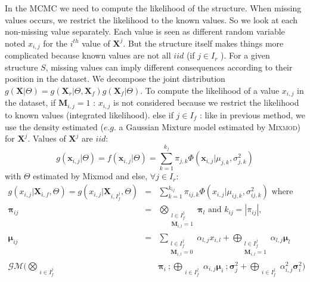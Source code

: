 \documentclass[11pt,a4paper]{report}
\begin{document}
		In the MCMC we need to compute the likelihood of the structure. When missing values occurs, we restrict the likelihood to the known values. So we look at each non-missing value separately. Each value is seen as different random variable noted $x_{i,j}$ for the $i^{th}$ value of $\boldsymbol{X}^j$.  But the structure itself makes things more complicated because known values are not all $iid$ (if $j \in I_r$ ).
			For a given structure $S$, missing values can imply different consequences according to their position in the dataset.
			We decompose the joint distribution $g(\boldsymbol{X}|\Theta)=g(\boldsymbol{X}_r|\Theta,\boldsymbol{X}_f)g(\boldsymbol{X}_f|\Theta)$.
			To compute the likelihood of a value $x_{i,j}$ in the dataset, if $\boldsymbol{M}_{i,j}=1$ : $x_{i,j}$ is not considered because we restrict the likelihood to known values (integrated likelihood).
				 else if $j \in I_f$ : like in previous method, we use the density estimated  ($e.g.$ a Gaussian Mixture model estimated by \textsc{Mixmod}) for $\boldsymbol{X}^j$. Values of $\boldsymbol{X}^j$ are $iid$: 
				 \begin{equation}
				 	g(\boldsymbol{x}_{i,j}|\Theta)=f(\boldsymbol{x}_{i,j}|\Theta)=\sum_{k=1}^{k_j}\pi_{j,k}\Phi(\boldsymbol{x}_{i,j}|\mu_{j,k},\sigma_{j,k}^2) 
				 \end{equation} with $\Theta$ estimated by Mixmod and
				 else, $\forall j \in I_r$:
			\begin{eqnarray}
				g(x_{i,j}| \boldsymbol{X}_{i,f},\Theta)=g(x_{i,j}| \boldsymbol{X}_{i,I_f^j},\Theta) &=& \sum_{k=1}^{k_{ij}}\pi_{ij,k}\Phi(x_{i,j}|\mu_{ij,k},\sigma_{ij,k}^2) \textrm{ where } \\
				\boldsymbol{\pi}_{ij} &=& \bigotimes_{\substack{l \in I_f^j \\ \boldsymbol{M}_{i,l}=1 } } \boldsymbol{\pi}_l \textrm{ and  }k_{ij}=|\pi_{ij}| ,\\
				\boldsymbol{\mu}_{ij}&=& \sum_{\substack{l \in I_f^j \\ \boldsymbol{M}_{i,l}=0  }}\alpha_{l,j}x_{i,l} + \bigoplus_{\substack{l \in I_f^j \\ \boldsymbol{M}_{i,l}=1  }} \alpha_{l,j} \boldsymbol{\mu}_l \\
					\mathcal{GM}(\bigotimes_{\substack{i \in I_f^j  }}&&\boldsymbol{\pi}_i \ ; 
			                         \bigoplus_{\substack{i \in I_f^j  }} \alpha_{i,j} \boldsymbol{\mu}_i \ ; 
			                         \boldsymbol{\sigma}_j^2+\bigoplus_{\substack{i \in I_f^j  }}\alpha_{i,j}^2 \boldsymbol{\sigma}_i^2 )								
			\end{eqnarray}
			 
\end{document}
